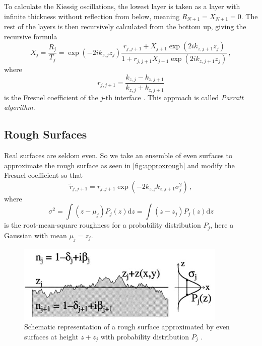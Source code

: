 To calculate the Kiessig oscillations, the lowest layer is taken as a layer with infinite thickness without reflection from below, meaning $R_{N+1} = X_{N+1} = 0$.
The rest of the layers is then recursively calculated from the bottom up, giving the recursive formula
\begin{equation}
    X_j = \frac{R_j}{T_j} = \exp(-2i k_{z,j} z_j)\frac{r_{j,j+1} + X_{j+1} \exp(2i k_{z,j+1} z_j)}{1 + r_{j,j+1} X_{j+1} \exp(2i k_{z,j+1} z_j)} \,,
    \label{eq:parrattalgo}
\end{equation}
where
\begin{equation*}
    r_{j,j+1} = \frac{k_{z,j} - k_{z,j+1}}{k_{z,j} + k_{z,j+1}}
\end{equation*}
is the Fresnel coefficient of the $j$-th interface \cite{tolan}.
This approach is called \textit{Parratt algorithm}.

\subsection{Rough Surfaces}

Real surfaces are seldom even.
So we take an ensemble of even surfaces to approximate the rough surface as seen in \autoref{fig:approxrough} and modify the Fresnel coefficient so that
\begin{equation}
    \tilde{r}_{j,j+1} = r_{j,j+1} \exp(-2 k_{z,j} k_{z,j+1}\sigma_j^2) \,,
    \label{eq:modifiedfresnelfcoefficient}
\end{equation}
where 
\begin{equation*}
    \sigma^2 = \int(z-\mu_j) P_j(z) \text{d}z = \int(z-z_j) P_j(z) \text{d}z
\end{equation*} 
is the root-mean-square roughness for a probability distribution $P_j$, here a Gaussian with mean $\mu_j = z_j$.

\begin{figure}
    \centering
    \includegraphics[width=.5\textwidth]{figures/parrott_rough.png}
    \caption{Schematic representation of a rough surface approximated by even surfaces at height $z + z_j$ with probability distribution $P_j$ \cite{tolan}.}
    \label{fig:approxrough}
\end{figure}

